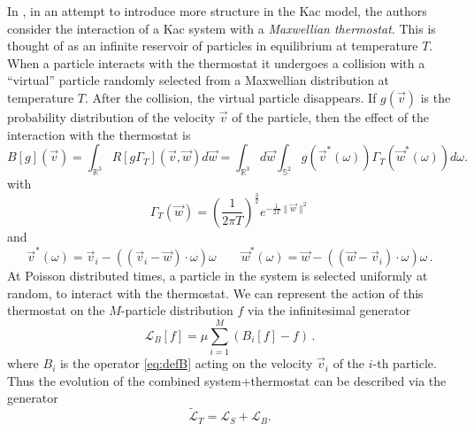 \documentclass{article}
\newcommand*\R{ \mathds{R} }
\begin{document}
In \cite{BLV}, in an attempt to introduce more structure in the Kac model, the authors consider the interaction of a Kac
system with a {\it Maxwellian thermostat}. This is thought of as an infinite reservoir of particles in equilibrium at
temperature $T$.  When a particle interacts with the thermostat it undergoes a collision with a ``virtual'' particle
randomly selected from a Maxwellian distribution at temperature $T$. After the collision, the virtual particle
disappears. If $g(\vec v)$ is the probability distribution of the velocity $\vec v$ of the particle, then the effect of
the interaction with the thermostat is
\begin{equation}\label{eq:defB}
B[g](\vec v)=\int_{\R^3}R[g\Gamma_T](\vec v,\vec w)d\vec w=\int_{\mathds R^3} d\vec w  \int_{\mathds 
S^2}g(\vec v^*(\omega))\Gamma_T(\vec w^*(\omega)) d \omega.
\end{equation}  
with 
\[
\Gamma_T(\vec w)=\left(\frac{1}{2\pi T}\right)^{\frac 32}e^{-\frac1{2T}\|\vec w\|^2}
\]
and
\begin{equation}\label{eq:rbomega}
\vec v^*(\omega)=\vec v_i-((\vec v_i-\vec w)\cdot\omega)\omega\qquad \vec w^*(\omega)=\vec
w-((\vec w-\vec v_i)\cdot\omega)\omega\, .
\end{equation}
At Poisson distributed times, a particle in the system is selected uniformly at random, to interact with the thermostat.
We can represent the action of this thermostat on the $M$-particle distribution $f$ via the infinitesimal generator
\begin{equation}\label{eq:genLB}
 \mathcal L_B[f]=\mu\sum_{i=1}^M (B_i[f]-f)\, .
\end{equation}
where $B_i$ is the operator \eqref{eq:defB} acting on the velocity $\vec v_i$ of the $i$-th particle.
Thus the evolution of the combined system+thermostat can be described via the generator
\begin{equation}\label{eq:gen1ther}
\widetilde{ \mathcal L}_T=\mathcal L_S+ \mathcal L_B.
\end{equation}
\end{document}

